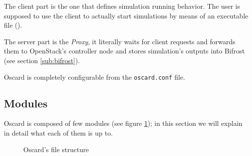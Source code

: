 The client part is the one that defines simulation running behavior. The user is supposed to use the client to actually start simulations by means of an executable file ().

The server part is the \textit{Proxy}, it literally waits for client requests and forwards them to OpenStack's controller node and stores simulation's outputs into Bifrost (see section \ref{sub:bifrost}).

Oscard is completely configurable from the \texttt{oscard.conf} file.

\subsection{Modules}
\label{sub:oscard_modules}
Oscard is composed of few modules (see figure \ref{fig:oscard_tree}); in this section we will explain in detail what each of them is up to.

\begin{figure}[H]
\label{fig:oscard_tree}
\caption{Oscard's file structure}
\end{figure}

